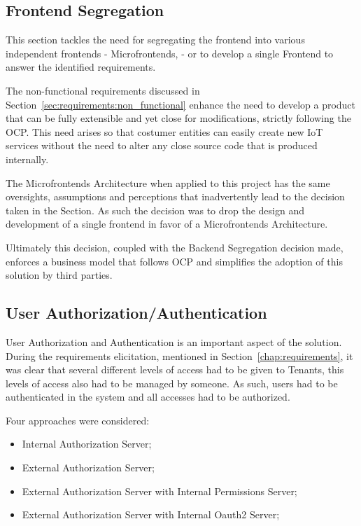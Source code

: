 \subsection{Frontend Segregation}
\label{subsec:design:alternatives:frontend}

This section tackles the need for segregating the frontend into various independent frontends - Microfrontends, \cite{microfrontends} - or to develop a single Frontend to answer the identified requirements.

The non-functional requirements discussed in Section~\ref{sec:requirements:non_functional} enhance the need to develop a product that can be fully extensible and yet close for modifications, strictly following the \gls{OCP}. This need arises so that costumer entities can easily create new \gls{IoT} services without the need to alter any close source code that is produced internally.

The Microfrontends Architecture when applied to this project has the same oversights, assumptions and perceptions that inadvertently lead to the decision taken in the  Section. As such the decision was to drop the design and development of a single frontend in favor of a Microfrontends Architecture.

Ultimately this decision, coupled with the Backend Segregation decision made, enforces a business model that follows \gls{OCP} and simplifies the adoption of this solution by third parties.

\subsection{User Authorization/Authentication}
\label{subsec:design:alternatives:auth}

User Authorization and Authentication is an important aspect of the solution. During the requirements elicitation, mentioned in Section~\ref{chap:requirements}, it was clear that several different levels of access had to be given to Tenants, this levels of access also had to be managed by someone. As such, users had to be authenticated in the system and all accesses had to be authorized.

Four approaches were considered:

\begin{itemize}
   \item Internal Authorization Server;
   \item External Authorization Server;
   \item External Authorization Server with Internal Permissions Server;
   \item External Authorization Server with Internal Oauth2 Server;
\end{itemize}


